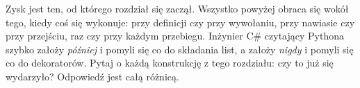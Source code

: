\noindent
Zysk jest ten, od którego rozdział się zaczął. Wszystko powyżej obraca się
wokół tego, kiedy coś się wykonuje: przy definicji czy przy wywołaniu, przy
nawiasie czy przy przejściu, raz czy przy każdym przebiegu. Inżynier C\#
czytający Pythona szybko założy \emph{później} i pomyli się co do składania
list, a założy \emph{nigdy} i pomyli się co do dekoratorów. Pytaj o każdą
konstrukcję z tego rozdziału: czy to już się wydarzyło? Odpowiedź jest całą
różnicą.
